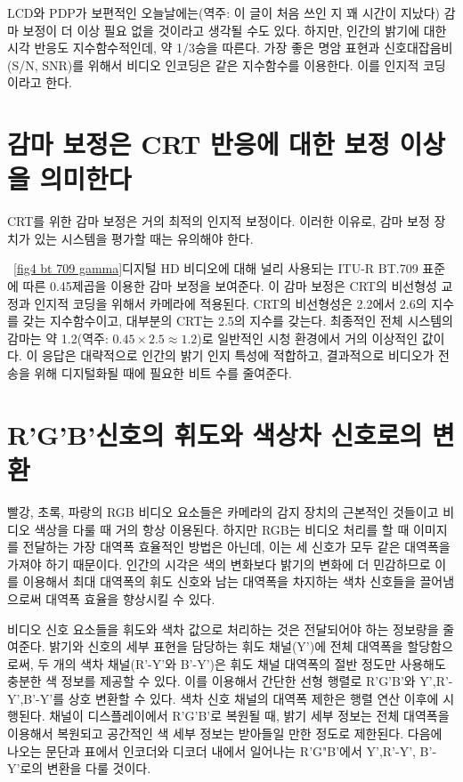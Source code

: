 LCD와 PDP가 보편적인 오늘날에는(역주: 이 글이 처음 쓰인 지 꽤 시간이 지났다) 감마 보정이 더 이상 필요 없을 것이라고 생각될 수도 있다.
하지만, 인간의 밝기에 대한 시각 반응도 지수함수적인데, 약 1/3승을 따른다. 가장 좋은 명암 표현과 신호대잡음비(S/N, SNR)를 위해서 비디오 인코딩은 같은 지수함수를 이용한다. 이를 인지적 코딩이라고 한다.

\section{감마 보정은 CRT 반응에 대한 보정 이상을 의미한다}
CRT를 위한 감마 보정은 거의 최적의 인지적 보정이다. 이러한 이유로, 감마 보정 장치가 있는 시스템을 평가할 때는 유의해야 한다.


\figurename~\ref{fig4 bt 709 gamma}\는 디지털 HD 비디오에 대해 널리 사용되는 ITU-R BT.709 표준에 따른 0.45제곱을 이용한 감마 보정을 보여준다.
이 감마 보정은 CRT의 비선형성 교정과 인지적 코딩을 위해서 카메라에 적용된다. CRT의 비선형성은 2.2에서 2.6의 지수를 갖는 지수함수이고, 대부분의 CRT는 2.5의 지수를 갖는다.
최종적인 전체 시스템의 감마는 약 1.2(역주: $0.45\times 2.5\approx 1.2$)로 일반적인 시청 환경에서 거의 이상적인 값이다. 이 응답은 대략적으로 인간의 밝기 인지 특성에 적합하고, 결과적으로 비디오가 전송을 위해 디지털화될 때에 필요한 비트 수를 줄여준다.

\section{R'G'B'신호의 휘도와 색상차 신호로의 변환}
빨강, 초록, 파랑의 RGB 비디오 요소들은 카메라의 감지 장치의 근본적인 것들이고 비디오 색상을 다룰 때 거의 항상 이용된다.
하지만 RGB는 비디오 처리를 할 때 이미지를 전달하는 가장 대역폭 효율적인 방법은 아닌데, 이는 세 신호가 모두 같은 대역폭을 가져야 하기 때문이다.
인간의 시각은 색의 변화보다 밝기의 변화에 더 민감하므로 이를 이용해서 최대 대역폭의 휘도 신호와 남는 대역폭을 차지하는 색차 신호들을 끌어냄으로써 대역폭 효율을 향상시킬 수 있다.


비디오 신호 요소들을 휘도와 색차 값으로 처리하는 것은 전달되어야 하는 정보량을 줄여준다. 밝기와 신호의 세부 표현을 담당하는 휘도 채널(Y')에 전체 대역폭을 할당함으로써, 두 개의 색차 채널(R'-Y'와 B'-Y')은 휘도 채널 대역폭의 절반 정도만 사용해도 충분한 색 정보를 제공할 수 있다.
이를 이용해서 간단한 선형 행렬로 R'G'B'와 Y',R'-Y',B'-Y'를 상호 변환할 수 있다. 색차 신호 채널의 대역폭 제한은 행렬 연산 이후에 시행된다.
채널이 디스플레이에서 R'G'B'로 복원될 때, 밝기 세부 정보는 전체 대역폭을 이용해서 복원되고 공간적인 색 세부 정보는 받아들일 만한 정도로 제한된다.
다음에 나오는 문단과 표에서 인코더와 디코더 내에서 일어나는 R'G"B'에서 Y',R'-Y', B'-Y'로의 변환을 다룰 것이다.


